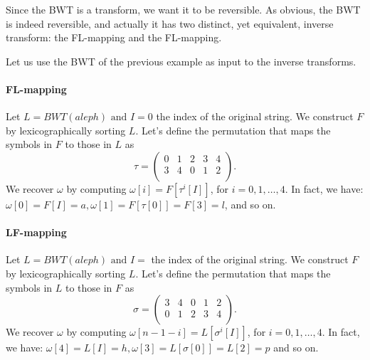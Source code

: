 \documentclass{subfiles}
\begin{document}
    Since the BWT is a transform, we want it to be reversible.
    As obvious, the BWT is indeed reversible, 
        and actually it has two distinct, yet equivalent, inverse transform:
        the FL-mapping and the FL-mapping.

    Let us use the BWT of the previous example as input to the inverse transforms.

    \paragraph*{FL-mapping}
    Let \(L = BWT(aleph) \text{ and } I = 0\) the index of the original string.
    We construct \(F\) by lexicographically sorting \(L\).
    Let's define the permutation that maps the symbols in \(F\) 
    to those in \(L\) as 
    \[
        \tau = \begin{pmatrix}
            0 & 1 & 2 & 3 & 4 \\ 
            3 & 4 & 0 & 1 & 2 \\
        \end{pmatrix}\text{.}
    \]
    We recover \(\omega\) by computing 
        \(\omega[i] = F[\tau^{i}[I]]\), for \(i = 0, 1, \ldots, 4\).
        In fact, we have: \(\omega[0] = F[I] = a, \omega[1] = F[\tau[0]] = F[3] = l\),
        and so on.

    \paragraph*{LF-mapping}
    Let \(L = BWT(aleph) \text{ and } I = \) the index of the original string.
    We construct \(F\) by lexicographically sorting \(L\). 
    Let's define the permutation that maps the symbols in \(L\) 
    to those in \(F\) as 
    \[
        \sigma = \begin{pmatrix}
            3 & 4 & 0 & 1 & 2 \\
            0 & 1 & 2 & 3 & 4 \\ 
        \end{pmatrix}\text{.}
    \]
    We recover \(\omega\) by computing 
        \(\omega[n - 1 - i] = L[\sigma^{i}[I]]\), for \(i = 0, 1, \ldots, 4\).
        In fact, we have: \(\omega[4] = L[I] = h, \omega[3] = L[\sigma[0]] = L[2] = p\) 
        and so on.
\end{document}
